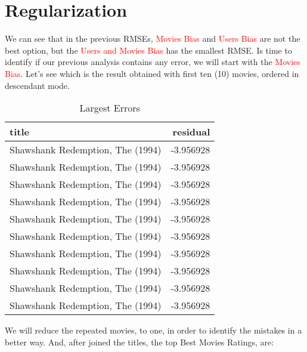 \documentclass[]{article}
\begin{document}
\pagebreak

\hypertarget{regularization}{%
\section{Regularization}\label{regularization}}

We can see that in the previous RMSEs, \textcolor{red}{Movies Bias} and
\textcolor{red}{Users Bias} are not the best option, but the
\textcolor{red}{Users and Movies Bias} has the smallest RMSE. Is time to
identify if our previous analysis contains any error, we will start with
the \textcolor{red}{Movies Bias}. Let's see which is the result obtained
with first ten (10) movies, ordered in descendant mode.

\begin{table}[!h]

\caption{\label{tab:prediction.largest.errors.movies.bias}Largest Errors}
\centering
\begin{tabular}{lr}
\toprule
title & residual\\
\midrule
\rowcolor{gray!6}  Shawshank Redemption, The (1994) & \vphantom{9} -3.956928\\
Shawshank Redemption, The (1994) & \vphantom{8} -3.956928\\
\rowcolor{gray!6}  Shawshank Redemption, The (1994) & \vphantom{7} -3.956928\\
Shawshank Redemption, The (1994) & \vphantom{6} -3.956928\\
\rowcolor{gray!6}  Shawshank Redemption, The (1994) & \vphantom{5} -3.956928\\
\addlinespace
Shawshank Redemption, The (1994) & \vphantom{4} -3.956928\\
\rowcolor{gray!6}  Shawshank Redemption, The (1994) & \vphantom{3} -3.956928\\
Shawshank Redemption, The (1994) & \vphantom{2} -3.956928\\
\rowcolor{gray!6}  Shawshank Redemption, The (1994) & \vphantom{1} -3.956928\\
Shawshank Redemption, The (1994) & -3.956928\\
\bottomrule
\end{tabular}
\end{table}

We will reduce the repeated movies, to one, in order to identify the
mistakes in a better way. And, after joined the titles, the top Best
Movies Ratings, are:
\end{document}
